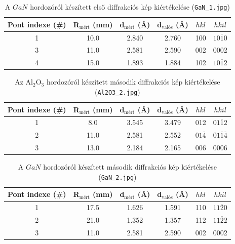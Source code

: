 \documentclass[12pt,a4paper]{article}
\begin{document}
\begin{table}[!h]
\begin{center}
\begin{tabular}{|c|c|c|c|c|c|}
\hline
Pont indexe (\#) & R$_{\textrm{mért}}$ (mm) & d$_{\textrm{mért}}$ (\AA) & d$_{\textrm{valós}}$ (\AA) & $hkl$ & $hkil$ \\
\hline
1 & 10.0 & 2.840 & 2.760 & 100 & $10\overline{1}0$ \\
\hline
3 & 11.0 & 2.581 & 2.590 & 002 & 0002 \\
\hline
4 & 15.0 & 1.893 & 1.884 & 102 &$ 10\overline{1}2$\\
\hline
\end{tabular}
\caption{A $GaN$ hordozóról készített első diffrakciós kép kiértékelése (\texttt{GaN\_1.jpg})}
\end{center}
\end{table}


\begin{table}[!h]
\begin{center}
\begin{tabular}{|c|c|c|c|c|c|}
\hline
Pont indexe (\#) & R$_{\textrm{mért}}$ (mm) & d$_{\textrm{mért}}$ (\AA) & d$_{\textrm{valós}}$ (\AA) & $hkl$ & $hkil$ \\
\hline
1 & 8.0 & 3.545 & 3.479 & 012 & $01\overline{1}2$ \\
\hline
2 & 11.0 & 2.581 & 2.552 & $01\overline{4}$ &$ 01\overline{1}\overline{4}$ \\
\hline
3 & 13.0 & 2.184 & 2.165 & $00\overline{6}$ & $000\overline{6}$\\
\hline
\end{tabular}
\caption{Az Al$_2$O$_3$ hordozóról készített második diffrakciós kép kiértékelése (\texttt{Al2O3\_2.jpg})}
\end{center}
\end{table}

\newpage
\begin{table}[!h]
\begin{center}
\begin{tabular}{|c|c|c|c|c|c|}
\hline
Pont indexe (\#) & R$_{\textrm{mért}}$ (mm) & d$_{\textrm{mért}}$ (\AA) & d$_{\textrm{valós}}$ (\AA) & $hkl$ & $hkil$ \\
\hline
1 & 17.5 & 1.626 & 1.591 & 110 & $11\overline{2}0$ \\
\hline
2 & 21.0 & 1.352 & 1.357 & 112 & $11\overline{2}2$ \\
\hline
3 & 11.0 & 2.581 & 2.590 & 002 & 0002\\
\hline
\end{tabular}
\caption{A $GaN$ hordozóról készített második diffrakciós kép kiértékelése (\texttt{GaN\_2.jpg})}
\end{center}
\end{table}
\end{document}
